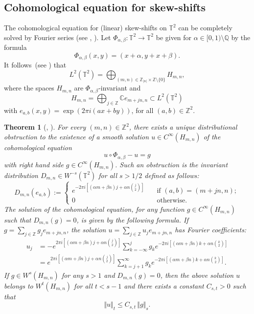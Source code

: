 \documentclass[JEP,XML,SOM,Unicode,NoEqCountersInSection]{cedram}
\newcounter{case}
\theoremstyle{definition}
\theoremstyle{plain}
\newtheorem{theorem}{Theorem}
\newcommand\CC{\mathbb{C}}
\newcommand\QQ{\mathbb{Q}}
\newcommand\TT{\mathbb{T}}
\newcommand\ZZ{\mathbb{Z}}
\begin{document}
\subsection{Cohomological equation for skew-shifts}

The cohomological equation for (linear) skew-shifts on $\TT^2$ can be completely solved by Fourier series (see \cite{Katok:CC}, \cite{AFU}).
Let $\Phi_{\alpha,\beta} :\TT^2\to \TT^2$ be given for $\alpha\in [0,1)\setminus \QQ$ by the formula
\[\Phi_{\alpha,\beta}(x,y)=(x+\alpha,y+x+\beta).\]
It follows~(see \cite{Anz}) that
\begin{equation*}%
L^2(\TT^2)=\bigoplus_{(m,n)\in \ZZ_{|n|}\times\ZZ\setminus\{0\}}H_{m,n},
\end{equation*}
where the spaces $H_{m,n}$ are $\Phi_{\alpha,\beta}$-invariant and
\[
H_{m,n}=\bigoplus_{j\in\ZZ} \CC e_{m+jn,n}\subset L^2(\TT^2)
\]
with $e_{a,b}(x,y)=\exp(2\pi i(ax+by))$, for all $(a,b)\in \ZZ^2$.

\begin{theorem}[{\cite[Th.\,11.25]{Katok:CC}, \cite[Th.\,10]{AFU}}]
\label{thm:smoothcb}
For every $(m,n)\in \ZZ^2$, there exists a unique distributional obstruction to the existence of a smooth solution $u\in C^{\infty} (H_{m,n})$ of the cohomological equation
\[
u\circ \Phi_{\alpha,\beta} - u =g
\]
with right hand side $g \in C^{\infty} (H_{m,n})$. Such an obstruction is the invariant distribution $D_{m,n} \in W^{-s} (\TT^2)$
for all $s>1/2$ defined as follows:
\[
D_{m,n} ( e_{a, b} ) :=
\begin{cases}
e^{-2\pi i [ (\alpha m +\beta n) j + \alpha n\binom{j}{2}] } \quad &\text {if } (a, b) =(m+jn, n); \\
0 \quad &\text{otherwise}.
\end{cases}
\]
The solution of the cohomological equation, for any function $g\in C^{\infty} (H_{m,n})$ such that
$D_{m,n} (g) =0$, is given by the following formula. If $g= \sum_{j\in \ZZ} g_j e_{m+jn, n}$,
the solution $u= \sum_{j\in \ZZ} u_j e_{m+jn, n}$ has Fourier coefficients:
\begin{equation*}
\begin{aligned}
u_j &= - e^{2\pi i [(\alpha m +\beta n)j + \alpha n \binom{j}{2}]} \sum_{k=-\infty}^j g_k
e^{ -2\pi i[(\alpha m +\beta n) k + \alpha n \binom{k}{2}]} \\ &=
e^{2\pi i [(\alpha m +\beta n)j + \alpha n \binom{j}{2}]}
\sum_{k=j+1}^{\infty} g_k e^{ -2\pi i[(\alpha m +\beta n) k + \alpha n \binom{k}{2}]}.
\end{aligned}
\end{equation*}
If $g \in W^s (H_{m,n})$ for any $s>1$ and $D_{m,n} (g) =0$, then the above solution
$u$ belongs to $W^t (H_{m,n})$ for all $t<s-1$ and there exists a constant $C_{s,t} >0$ such that
\[
\Vert u\Vert _t \leq C_{s,t} \, \Vert g \Vert_s.
\]
\end{theorem}
\end{document}
